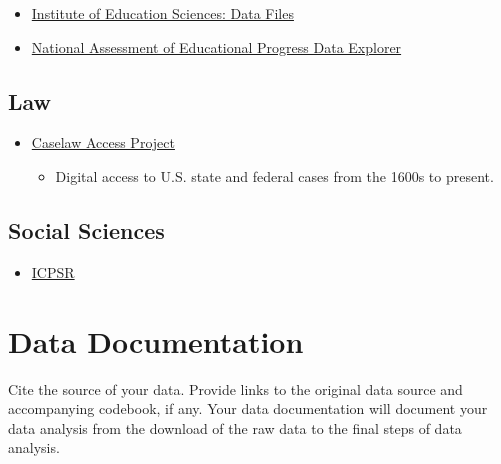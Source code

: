 \documentclass[]{book}
\providecommand{\tightlist}{%
  \setlength{\itemsep}{0pt}\setlength{\parskip}{0pt}}
\begin{document}
\begin{itemize}
\tightlist
\item
  \href{https://ies.ed.gov/data.asp}{Institute of Education Sciences: Data Files}
\item
  \href{https://www.nationsreportcard.gov/ndecore/landing}{National Assessment of Educational Progress Data Explorer}
\end{itemize}

\hypertarget{law}{%
\subsection{Law}\label{law}}

\begin{itemize}
\tightlist
\item
  \href{https://case.law/}{Caselaw Access Project}

  \begin{itemize}
  \tightlist
  \item
    Digital access to U.S. state and federal cases from the 1600s to present.
  \end{itemize}
\end{itemize}

\hypertarget{social-sciences-1}{%
\subsection{Social Sciences}\label{social-sciences-1}}

\begin{itemize}
\tightlist
\item
  \href{https://www.icpsr.umich.edu/icpsrweb/ICPSR/}{ICPSR}
\end{itemize}

\hypertarget{data-documentation}{%
\section{Data Documentation}\label{data-documentation}}

Cite the source of your data. Provide links to the original data source and accompanying codebook, if any. Your data documentation will document your data analysis from the download of the raw data to the final steps of data analysis.
\end{document}
